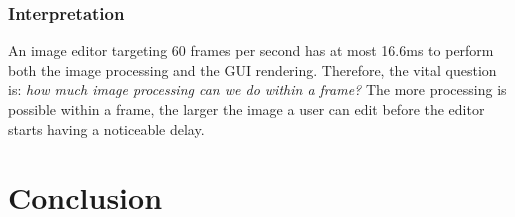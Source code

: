 \documentclass[12pt]{article}
\begin{document}
\subsubsection{Interpretation}

An image editor targeting 60 frames per second has at most 16.6ms to perform both the image
processing and the GUI rendering.  Therefore, the vital question is: \emph{how much image processing
can we do within a frame?}  The more processing is possible within a frame, the larger the image a
user can edit before the editor starts having a noticeable delay.



\pagebreak

\section{Conclusion}



\pagebreak

\begin{thebibliography}{99}
\end{thebibliography}
\end{document}
